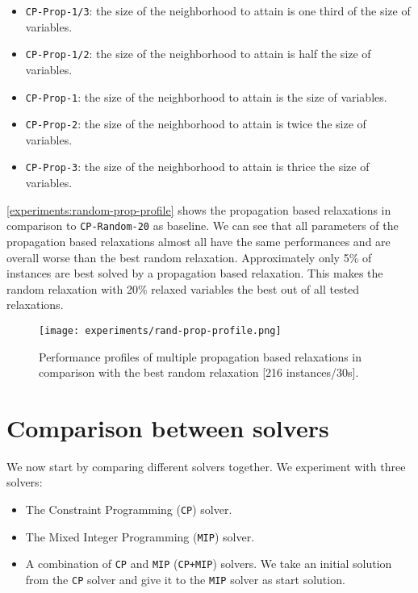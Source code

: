 \documentclass[../../thesis.tex]{subfiles}
\begin{document}
\begin{itemize}
  \item \texttt{CP-Prop-1/3}: the size of the neighborhood to attain is one third of the size of variables.
  \item \texttt{CP-Prop-1/2}: the size of the neighborhood to attain is half the size of variables.
  \item \texttt{CP-Prop-1}: the size of the neighborhood to attain is the size of variables.
  \item \texttt{CP-Prop-2}: the size of the neighborhood to attain is twice the size of variables.
  \item \texttt{CP-Prop-3}: the size of the neighborhood to attain is thrice the size of variables.
\end{itemize}

\autoref{experiments:random-prop-profile} shows the propagation based relaxations in comparison to \texttt{CP-Random-20} as baseline.
We can see that all parameters of the propagation based relaxations almost all have the same performances and 
are overall worse than the best random relaxation. Approximately only 5\% of instances are best solved by a propagation based 
relaxation. This makes the random relaxation with 20\% relaxed variables the best out of all tested relaxations.

\begin{figure}
  \centering
  \texttt{[image: experiments/rand-prop-profile.png]}
  \caption{Performance profiles of multiple propagation based relaxations in comparison with the best random relaxation [216 instances/30s].}
  \label{experiments:random-prop-profile}
\end{figure}


\section{Comparison between solvers}

We now start by comparing different solvers together. We experiment with three solvers: 

\begin{itemize}
  \item The Constraint Programming (\texttt{CP}) solver.
  \item The Mixed Integer Programming (\texttt{MIP}) solver.
  \item A combination of \texttt{CP} and \texttt{MIP} (\texttt{CP+MIP}) solvers. We take an initial solution from the \texttt{CP} solver 
  and give it to the \texttt{MIP} solver as start solution. 
\end{itemize}
\end{document}
